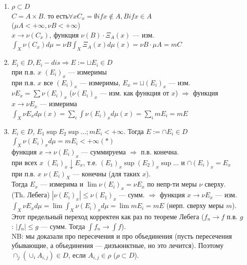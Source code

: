 \documentclass[paper=a4, fontsize=17pt]{article}
\begin{document}
		\begin{enumerate}
			\item
				$\rho \subset D$\\
				$C = A \times B$. то есть$\forall x C_x = {\emptyset if x \not\in A, B if x \in A}$\\
				($\mu A  < +\infty, \nu B < +\infty$)\\
				$x \rightarrow \nu(C_x)$, функция $\nu(B) \cdot \Xi_A(x)$ --- изм.\\
				$\int_X \nu(C_x)d\mu = \nu B \int_X \Xi_A(x)d\mu(x) = \nu B \cdot \mu A = m C$
			\item
				$E_i \in D, E_i - dis \Rightarrow E := \sqcup E_i \in D$\\
				при п.в. $x$ $(E_i)_x$ --- измеримы\\
				при п.в. $x$ все $(E_i)_x$ --- измеримы, $E_x = \sqcup (E_i)_x$ --- изм.\\
				$\nu E_x = \sum \nu (E_i)_x$ ($\nu (E_i)_x$ --- изм. как функция от $x$) $\Rightarrow$ функция $ x \rightarrow \nu E_x$ --- измерима\\
				$\int_X \nu E_x d\mu(x) = \sum_{i}\int\nu(E_i)_x d\mu(x) = \sum_{i}m E_i = m E$
			\item
				$E_i \in D$, $E_1 \sup E_2 \sup \ldots ; m E_i < +\infty$. Тогда $E := \cap E_i \in D$\\
				$\int_X\nu(E_i)_x d\mu = m E_i < +\infty(*)$\\
				функция $x \rightarrow \nu(E_i)_x$ --- суммируема $\Rightarrow$ п.в. конечна.\\
				при всех $x$ $(E_i)_x \downarrow E_x$, т.е. $(E_1)_x \sup (E_2)_x \sup \ldots $ и $\cap(E_i)_x = E_x$\\
				при п.в. $x$ $\nu(E_i)_X$ --- конечны (для таких $x$).\\
				Тогда $E_x$ --- измерима и $\lim \nu(E_i)_x = \nu E_x$ по непр-ти меры $\nu$ сверху.\\
				(Th. Лебега) $|\nu(E_i)_x| \leq \nu(E_1)_x$ --- сумм. $\Rightarrow$ функция $x \rightarrow \nu E_x$ --- изм.\\
				$\int_X\nu E_x d\mu = \lim\int_X\nu(E_i)_x d\mu = \lim m E_i = m E$ (нерп. сверху меры $m$). Этот предельный переход корректен как раз по теореме Лебега ($f_n \rightarrow f$ п.в. $g$ : $|f_n| \leq g$ --- сумм. Тогда $\int f_n \rightarrow \int f$).\\
				NB: мы доказали про пересечения и про объединения (пусть пересечения убывающие, а объединения --- дизъюнктные, но это лечится). Поэтому $\cap_j(\cup_i A_{i, j}) \in D$, если $A_{i,j} \in \rho$ ($\rho \subset D$).

\end{enumerate}
\end{document}
